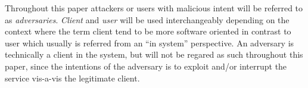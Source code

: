 Throughout this paper attackers or users with malicious intent will be referred to as \emph{adversaries}.
\emph{Client} and \emph{user} will be used interchangeably depending on the context where the term client tend to be more software oriented in contrast to user which usually is referred from an ``in system'' perspective.
An adversary is technically a client in the system, but will not be regared as such throughout this paper, since the intentions of the adversary is to exploit and/or interrupt the service vis-a-vis the legitimate client. 
